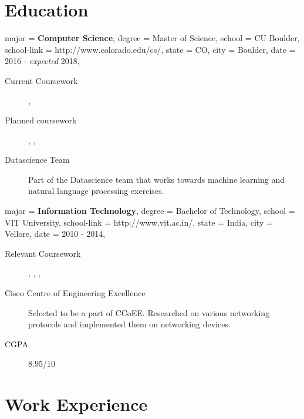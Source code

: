\documentclass{simplecv}
\begin{document}
\maketitle

\section{Education} 
\begin{education}
  {
      major = \textbf{Computer Science},
      degree = Master of Science,
      school = CU Boulder,
      school-link = http://www.colorado.edu/cs/,
      state = CO,
      city = Boulder,
      date = 2016 - \textit{expected} 2018,
  }

\begin{description}
     \item[Current Coursework]
       ,
      \item[Planned coursework]
        ,
        ,
      \item[Datascience Team] Part of the Datascience team that works towards machine learning and natural language processing exercises.
\end{description}
\end{education}
\begin{education}
  {
      major = \textbf{Information Technology},
      degree = Bachelor of Technology,
      school = VIT University,
      school-link = http://www.vit.ac.in/,
      state = India,
      city = Vellore,
      date = 2010 - 2014,
  }
\begin{description}
    \item[Relevant Coursework]
      ,
      ,
      ,
    \item[Cisco Centre of Engineering Excellence] Selected to be a part of CCoEE. Researched on various networking protocols and implemented them on networking devices.
    \item[CGPA] 8.95/10
\end{description}
\end{education}
  \section{Work Experience}
\end{document}
